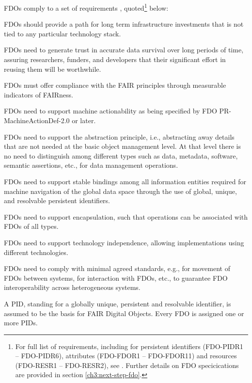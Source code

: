 FDOs comply to a set of requirements \cite{Anders 2023}, quoted\footnote{
    For full list of requirements, including for persistent identifiers (FDO-PIDR1 -- FDO-PIDR6), attributes (FDO-FDOR1 -- FDO-FDOR11) and resources (FDO-RESR1 -- FDO-RESR2), see \cite{Anders 2023}. Further details on FDO specicications are provided in section \vref{ch3:next-step-fdo}.
} below:

\begin{description}
    \label{ch10:fdo-guidelines}
        \small
\item[G1] FDOs should provide a path for long term infrastructure investments that is not tied to any particular technology stack. 
\item[G2] FDOs need to generate trust in accurate data survival over long periods of time, assuring researchers, funders, and developers that their significant effort in reusing them will be worthwhile. 
\item[G3] FDOs must offer compliance with the FAIR principles through measurable indicators of FAIRness.
\item[G4] FDOs need to support machine actionability as being specified by FDO PR-MachineActionDef-2.0 \cite{Weiland 2022b} or later. 
\item[G5] FDOs need to support the abstraction principle, i.e., abstracting away details that are not needed at the basic object management level.  At that level there is no need to distinguish among different types such as data, metadata, software, semantic assertions, etc., for data management operations. 
\item[G6] FDOs need to support stable bindings among all information entities required for machine navigation of the global data space through the use of global, unique, and resolvable persistent identifiers. 
\item[G7] FDOs need to support encapsulation, such that operations can be associated with FDOs of all types.  
\item[G8] FDOs need to support technology independence, allowing implementations using different technologies. 
\item[G9] FDOs need to comply with minimal agreed standards, e.g., for movement of FDOs between systems, for interaction with FDOs, etc., to guarantee FDO interoperability across heterogeneous systems.
\item[FDO-GR1] A PID, standing for a globally unique, persistent and resolvable identifier, is assumed to be the basis for FAIR Digital Objects.  Every FDO is assigned one or more PIDs. 

\end{description}
